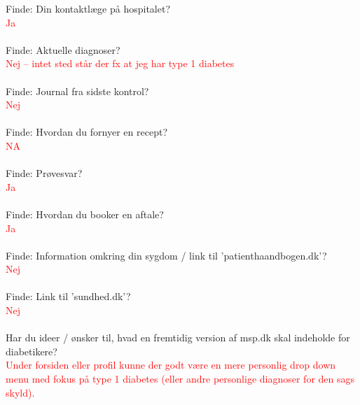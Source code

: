 Finde: Din kontaktlæge på hospitalet?\\
\textcolor{red}{Ja}
\\ \\
Finde: Aktuelle diagnoser?\\
\textcolor{red}{Nej – intet sted står der fx at jeg har type 1 diabetes} 
\\ \\
Finde: Journal fra sidste kontrol?\\
\textcolor{red}{Nej}
\\ \\
Finde: Hvordan du fornyer en recept?\\
\textcolor{red}{NA}
\\ \\
Finde: Prøvesvar?\\
\textcolor{red}{Ja}
\\ \\
Finde: Hvordan du booker en aftale?\\
\textcolor{red}{Ja}
\\ \\
Finde: Information omkring din sygdom / link til ’patienthaandbogen.dk’?\\
\textcolor{red}{Nej}
\\ \\
Finde: Link til ’sundhed.dk’?\\
\textcolor{red}{Nej}
\\ \\
Har du ideer / ønsker til, hvad en fremtidig version af msp.dk skal indeholde for diabetikere?\\
\textcolor{red}{Under forsiden eller profil kunne der godt være en mere personlig drop down menu med fokus på type 1 diabetes (eller andre personlige diagnoser for den sags skyld).}
